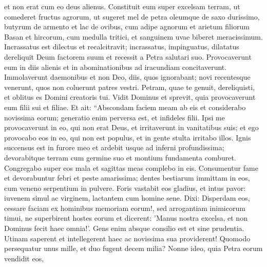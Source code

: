 \begin{biblechapter}
\begin{biblechapter}
\begin{biblechapter}
\begin{biblechapter}
\begin{biblechapter}
\begin{biblechapter}
\begin{biblechapter}
\begin{biblechapter}
\begin{biblechapter}
\begin{biblechapter}
\begin{biblechapter}
\begin{biblechapter}
\begin{biblechapter}
\begin{biblechapter}
\begin{biblechapter}
\begin{biblechapter}
\begin{biblechapter}
\begin{biblechapter}
\begin{biblechapter}
\begin{biblechapter}
\begin{biblechapter}
\begin{biblechapter}
\begin{biblechapter}
\begin{biblechapter}
\begin{biblechapter}
\begin{biblechapter}
\begin{biblechapter}
\begin{biblechapter}
\begin{biblechapter}
\begin{biblechapter}
\begin{biblechapter}
\begin{biblechapter}
 et non erat cum eo deus alienus.
 \verse Constituit eum super excelsam terram,
 ut comederet fructus agrorum,
 ut sugeret mel de petra
 oleumque de saxo durissimo,
 \verse butyrum de armento et lac de ovibus,
 cum adipe agnorum et arietum
 filiorum Basan et hircorum,
 cum medulla tritici,
 et sanguinem uvae biberet meracissimum.
 \verse Incrassatus est dilectus et recalcitravit;
 incrassatus, impinguatus, dilatatus dereliquit Deum factorem suum
 et recessit a Petra salutari suo.
 \verse Provocaverunt eum in diis alienis
 et in abominationibus ad iracundiam concitaverunt.
 \verse Immolaverunt daemonibus et non Deo,
 diis, quos ignorabant;
 novi recentesque venerunt,
 quos non coluerunt patres vestri.
 \verse Petram, quae te genuit, dereliquisti,
 et oblitus es Domini creatoris tui.
 \verse Vidit Dominus et sprevit,
 quia provocaverunt eum filii sui et filiae.
 \verse Et ait: “Abscondam faciem meam ab eis
 et considerabo novissima eorum;
 generatio enim perversa est,
 et infideles filii.
 \verse Ipsi me provocaverunt in eo, qui non erat Deus,
 et irritaverunt in vanitatibus suis;
 et ego provocabo eos in eo, qui non est populus,
 et in gente stulta irritabo illos.
 \verse Ignis succensus est in furore meo
 et ardebit usque ad inferni profundissima;
 devorabitque terram cum germine suo
 et montium fundamenta comburet. 
\verse Congregabo super eos mala
 et sagittas meas complebo in eis.
 \verse Consumentur fame et devorabuntur febri
 et peste amarissima;
 dentes bestiarum immittam in eos, cum veneno serpentium in pulvere. 
\verse Foris vastabit eos gladius,
 et intus pavor:
 iuvenem simul ac virginem,
 lactantem cum homine sene.
 \verse Dixi: Disperdam eos,
 cessare faciam ex hominibus memoriam eorum!,
 \verse sed arrogantiam inimicorum timui,
 ne superbirent hostes eorum
 et dicerent: 'Manus nostra excelsa, et non Dominus fecit haec omnia!'. 
\verse Gens enim absque consilio est
 et sine prudentia.
 \verse Utinam saperent et intellegerent haec
 ac novissima sua providerent!
 \verse Quomodo persequatur unus mille,
 et duo fugent decem milia?
 Nonne ideo, quia Petra eorum vendidit eos,

\end{biblechapter}
\end{biblechapter}
\end{biblechapter}
\end{biblechapter}
\end{biblechapter}
\end{biblechapter}
\end{biblechapter}
\end{biblechapter}
\end{biblechapter}
\end{biblechapter}
\end{biblechapter}
\end{biblechapter}
\end{biblechapter}
\end{biblechapter}
\end{biblechapter}
\end{biblechapter}
\end{biblechapter}
\end{biblechapter}
\end{biblechapter}
\end{biblechapter}
\end{biblechapter}
\end{biblechapter}
\end{biblechapter}
\end{biblechapter}
\end{biblechapter}
\end{biblechapter}
\end{biblechapter}
\end{biblechapter}
\end{biblechapter}
\end{biblechapter}
\end{biblechapter}
\end{biblechapter}

